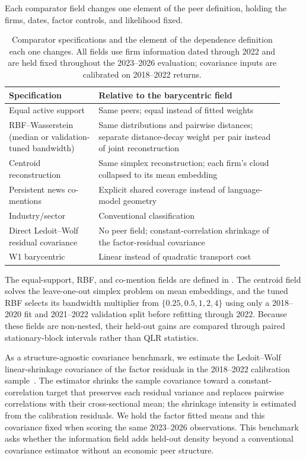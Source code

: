 Each comparator field changes one element of the peer definition, holding the
firms, dates, factor controls, and likelihood fixed.

\begin{table}[H]
  \centering
  \caption{Comparator specifications and the element of the dependence
    definition each one changes. All fields use firm information dated through
    2022 and are held fixed throughout the 2023--2026 evaluation; covariance
  inputs are calibrated on 2018--2022 returns.}
  \label{tab:comparator-design}
  \small
  \begin{tabular}{p{0.3\linewidth}p{0.62\linewidth}}
    \toprule
    Specification & Relative to the barycentric field \\
    \midrule
    Equal active support & Same peers; equal instead of fitted weights \\
    RBF--Wasserstein (median or validation-tuned bandwidth) & Same
    distributions and pairwise distances; separate distance-decay weight per
    pair instead of joint reconstruction \\
    Centroid reconstruction & Same simplex reconstruction; each firm's cloud
    collapsed to its mean embedding \\
    Persistent news co-mentions & Explicit shared coverage instead of
    language-model geometry \\
    Industry/sector & Conventional classification \\
    Direct Ledoit--Wolf residual covariance & No peer field; constant-correlation
    shrinkage of the factor-residual covariance \\
    W1 barycentric & Linear instead of quadratic transport cost \\
    \bottomrule
  \end{tabular}
\end{table}

The equal-support, RBF, and co-mention fields are defined in
.
The centroid field solves the leave-one-out simplex problem on mean
embeddings, and the tuned RBF selects its bandwidth multiplier from
$\{0.25,0.5,1,2,4\}$ using only a 2018--2020 fit and 2021--2022 validation
split before refitting through 2022.
Because these fields are non-nested, their held-out gains are compared through
paired stationary-block intervals rather than QLR statistics.

As a structure-agnostic covariance benchmark, we estimate the Ledoit--Wolf
linear-shrinkage covariance of the factor residuals in the 2018--2022
calibration sample~\citep{ledoit_wolf_2004}. The estimator shrinks the sample
covariance toward a constant-correlation target that preserves each residual
variance and replaces pairwise correlations with their cross-sectional mean;
the shrinkage intensity is estimated from the calibration residuals. We hold
the factor fitted means and this covariance fixed when scoring the same
2023--2026 observations. This benchmark asks whether the information field
adds held-out density beyond a conventional covariance estimator without an
economic peer structure.

